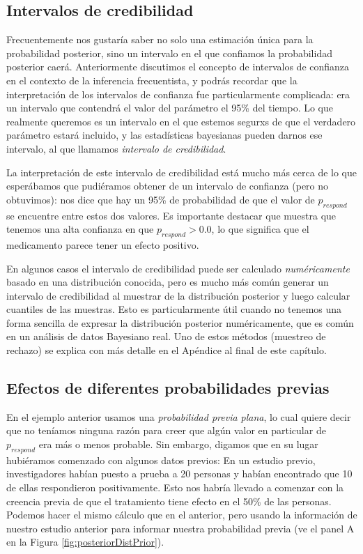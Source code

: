 \documentclass[
  12pt,
]{book}
\begin{document}
\hypertarget{intervalos-de-credibilidad}{%
\subsection{Intervalos de credibilidad}\label{intervalos-de-credibilidad}}

Frecuentemente nos gustaría saber no solo una estimación única para la probabilidad posterior, sino un intervalo en el que confiamos la probabilidad posterior caerá. Anteriormente discutimos el concepto de intervalos de confianza en el contexto de la inferencia frecuentista, y podrás recordar que la interpretación de los intervalos de confianza fue particularmente complicada: era un intervalo que contendrá el valor del parámetro el 95\% del tiempo. Lo que realmente queremos es un intervalo en el que estemos segurxs de que el verdadero parámetro estará incluido, y las estadísticas bayesianas pueden darnos ese intervalo, al que llamamos \emph{intervalo de credibilidad}.

La interpretación de este intervalo de credibilidad está mucho más cerca de lo que esperábamos que pudiéramos obtener de un intervalo de confianza (pero no obtuvimos): nos dice que hay un 95\% de probabilidad de que el valor de \(p_{respond}\) se encuentre entre estos dos valores. Es importante destacar que muestra que tenemos una alta confianza en que \(p_{respond} > 0.0\), lo que significa que el medicamento parece tener un efecto positivo.

En algunos casos el intervalo de credibilidad puede ser calculado \emph{numéricamente} basado en una distribución conocida, pero es mucho más común generar un intervalo de credibilidad al muestrar de la distribución posterior y luego calcular cuantiles de las muestras. Esto es particularmente útil cuando no tenemos una forma sencilla de expresar la distribución posterior numéricamente, que es común en un análisis de datos Bayesiano real. Uno de estos métodos (muestreo de rechazo) se explica con más detalle en el Apéndice al final de este capítulo.

\hypertarget{efectos-de-diferentes-probabilidades-previas}{%
\subsection{Efectos de diferentes probabilidades previas}\label{efectos-de-diferentes-probabilidades-previas}}

En el ejemplo anterior usamos una \emph{probabilidad previa plana}, lo cual quiere decir que no teníamos ninguna razón para creer que algún valor en particular de \(p_{respond}\) era más o menos probable. Sin embargo, digamos que en su lugar hubiéramos comenzado con algunos datos previos: En un estudio previo, investigadores habían puesto a prueba a 20 personas y habían encontrado que 10 de ellas respondieron positivamente. Esto nos habría llevado a comenzar con la creencia previa de que el tratamiento tiene efecto en el 50\% de las personas. Podemos hacer el mismo cálculo que en el anterior, pero usando la información de nuestro estudio anterior para informar nuestra probabilidad previa (ve el panel A en la Figura \ref{fig:posteriorDistPrior}).
\end{document}
